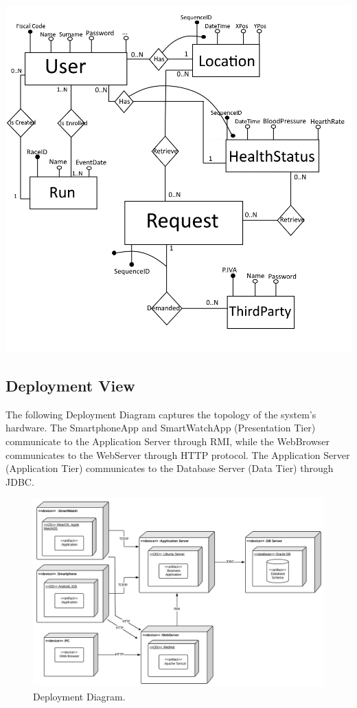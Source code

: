 \includegraphics[scale=0.5]{Images/ERDiagram.png}


\subsection{Deployment View}
The following Deployment Diagram captures the topology of the system's hardware.
The SmartphoneApp and SmartWatchApp (Presentation Tier) communicate to the Application Server through RMI, while the WebBrowser communicates to the WebServer through HTTP protocol. The Application Server (Application Tier) communicates to the Database Server (Data Tier) through JDBC.

\begin{figure}[H]
\centering
\includegraphics[scale=0.13]{Images/DeploymentDiagram.png}
\caption{Deployment Diagram.}
\end{figure}

